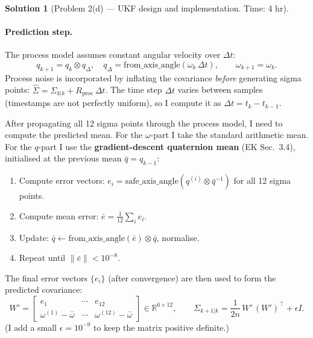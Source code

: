 \documentclass[11pt, reqno, letterpaper]{amsart}
\theoremstyle{plain}
\theoremstyle{definition}
\newtheorem{solution}[theorem]{Solution}
\begin{document}
\begin{solution}[Problem 2(d) — UKF design and implementation. Time: 4 hr]
\paragraph{Prediction step.}
The process model assumes constant angular velocity over $\Delta t$:
\[
  q_{k+1} = q_k \otimes q_\Delta, \quad
  q_\Delta = \text{from\_axis\_angle}(\omega_k\,\Delta t), \qquad
  \omega_{k+1} = \omega_k.
\]
Process noise is incorporated by inflating the covariance \emph{before}
generating sigma points: $\hat\Sigma = \Sigma_{k|k} + R_\text{proc}\,\Delta t$.
The time step $\Delta t$ varies between samples (timestamps are not
perfectly uniform), so I compute it as $\Delta t = t_k - t_{k-1}$.

After propagating all 12 sigma points through the process model, I need to
compute the predicted mean.  For the $\omega$-part I take the standard
arithmetic mean.  For the $q$-part I use the \textbf{gradient-descent
quaternion mean} (EK Sec.\ 3.4), initialised at the previous mean
$\bar q=q_{k-1}$:
\begin{enumerate}
  \item Compute error vectors: $e_i = \text{safe\_axis\_angle}(q^{(i)}\otimes\bar q^{-1})$
    for all 12 sigma points.
  \item Compute mean error: $\bar e = \frac{1}{12}\sum_i e_i$.
  \item Update: $\bar q \leftarrow \text{from\_axis\_angle}(\bar e)\otimes\bar q$,\;
    normalise.
  \item Repeat until $\|\bar e\|<10^{-8}$.
\end{enumerate}
The final error vectors $\{e_i\}$ (after convergence) are then used to
form the predicted covariance:
\[
  W' = \begin{bmatrix} e_1 & \cdots & e_{12} \\ \omega^{(1)}-\bar\omega & \cdots & \omega^{(12)}-\bar\omega \end{bmatrix} \in \mathbb{R}^{6\times12},
  \qquad
  \Sigma_{k+1|k} = \frac{1}{2n}\,W'\,(W')^\top + \epsilon I.
\]
(I add a small $\epsilon=10^{-9}$ to keep the matrix positive definite.)


\end{solution}
\end{document}
